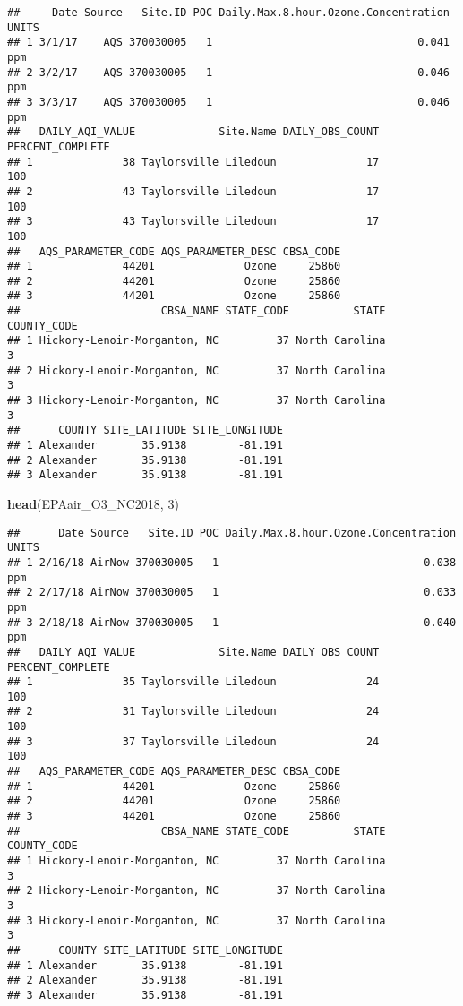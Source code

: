 \documentclass[]{article}
\newenvironment{Shaded}{\begin{snugshade}}{\end{snugshade}}
\newcommand{\KeywordTok}[1]{\textcolor[rgb]{0.13,0.29,0.53}{\textbf{#1}}}
\newcommand{\DecValTok}[1]{\textcolor[rgb]{0.00,0.00,0.81}{#1}}
\newcommand{\NormalTok}[1]{#1}
\begin{document}
\begin{verbatim}
##     Date Source   Site.ID POC Daily.Max.8.hour.Ozone.Concentration UNITS
## 1 3/1/17    AQS 370030005   1                                0.041   ppm
## 2 3/2/17    AQS 370030005   1                                0.046   ppm
## 3 3/3/17    AQS 370030005   1                                0.046   ppm
##   DAILY_AQI_VALUE             Site.Name DAILY_OBS_COUNT PERCENT_COMPLETE
## 1              38 Taylorsville Liledoun              17              100
## 2              43 Taylorsville Liledoun              17              100
## 3              43 Taylorsville Liledoun              17              100
##   AQS_PARAMETER_CODE AQS_PARAMETER_DESC CBSA_CODE
## 1              44201              Ozone     25860
## 2              44201              Ozone     25860
## 3              44201              Ozone     25860
##                      CBSA_NAME STATE_CODE          STATE COUNTY_CODE
## 1 Hickory-Lenoir-Morganton, NC         37 North Carolina           3
## 2 Hickory-Lenoir-Morganton, NC         37 North Carolina           3
## 3 Hickory-Lenoir-Morganton, NC         37 North Carolina           3
##      COUNTY SITE_LATITUDE SITE_LONGITUDE
## 1 Alexander       35.9138        -81.191
## 2 Alexander       35.9138        -81.191
## 3 Alexander       35.9138        -81.191
\end{verbatim}

\begin{Shaded}
\begin{Highlighting}[]
\KeywordTok{head}\NormalTok{(EPAair_O3_NC2018, }\DecValTok{3}\NormalTok{)}
\end{Highlighting}
\end{Shaded}

\begin{verbatim}
##      Date Source   Site.ID POC Daily.Max.8.hour.Ozone.Concentration UNITS
## 1 2/16/18 AirNow 370030005   1                                0.038   ppm
## 2 2/17/18 AirNow 370030005   1                                0.033   ppm
## 3 2/18/18 AirNow 370030005   1                                0.040   ppm
##   DAILY_AQI_VALUE             Site.Name DAILY_OBS_COUNT PERCENT_COMPLETE
## 1              35 Taylorsville Liledoun              24              100
## 2              31 Taylorsville Liledoun              24              100
## 3              37 Taylorsville Liledoun              24              100
##   AQS_PARAMETER_CODE AQS_PARAMETER_DESC CBSA_CODE
## 1              44201              Ozone     25860
## 2              44201              Ozone     25860
## 3              44201              Ozone     25860
##                      CBSA_NAME STATE_CODE          STATE COUNTY_CODE
## 1 Hickory-Lenoir-Morganton, NC         37 North Carolina           3
## 2 Hickory-Lenoir-Morganton, NC         37 North Carolina           3
## 3 Hickory-Lenoir-Morganton, NC         37 North Carolina           3
##      COUNTY SITE_LATITUDE SITE_LONGITUDE
## 1 Alexander       35.9138        -81.191
## 2 Alexander       35.9138        -81.191
## 3 Alexander       35.9138        -81.191
\end{verbatim}
\end{document}
